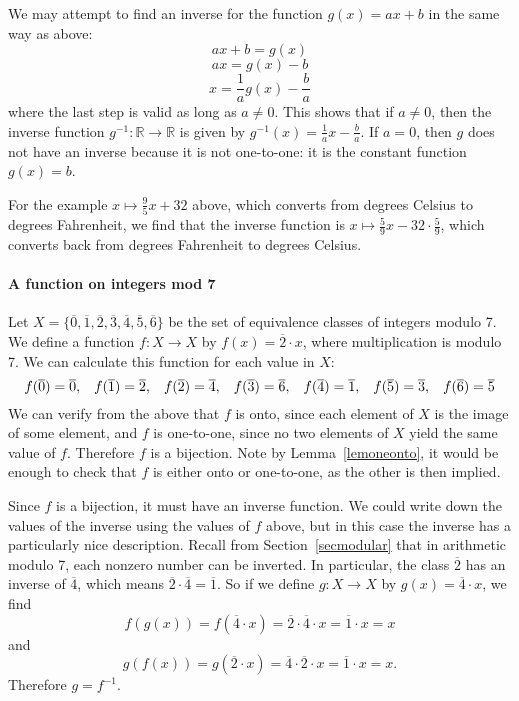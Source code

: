 We may attempt to find an inverse for the function $g(x) = ax+b$ in the same way as above:
\[
ax+b = g(x)
\]
\[
ax=g(x)-b
\]
\[
x = \frac{1}{a}g(x)-\frac{b}{a}
\]
where the last step is valid as long as $a \neq 0$.
This shows that if $a \neq 0$, then the inverse function $g^{-1} \colon \mathbb{R} \to \mathbb{R}$ is given by $g^{-1}(x) = \frac{1}{a}x-\frac{b}{a}$.
If $a=0$, then $g$ does not have an inverse because it is not one-to-one: it is the constant function $g(x)=b$.

For the example $x \mapsto \frac{9}{5} x + 32$ above, which converts from degrees Celsius to degrees Fahrenheit, we find that the inverse function is $x \mapsto \frac{5}{9} x - 32 \cdot \frac{5}{9}$, which converts back from degrees Fahrenheit to degrees Celsius.

\paragraph{A function on integers mod 7}

Let $X = \{ \overline{0}, \overline{1}, \overline{2}, \overline{3}, \overline{4}, \overline{5}, \overline{6}\}$ be the set of equivalence classes of integers modulo 7.
We define a function $f \colon X \to X$ by $f(x) = \overline{2} \cdot x$, where multiplication is modulo 7.
We can calculate this function for each value in $X$:
\[
f(\overline{0}) = \overline{0}, \hspace{.3cm}
f(\overline{1}) = \overline{2}, \hspace{.3cm}
f(\overline{2}) = \overline{4}, \hspace{.3cm}
f(\overline{3}) = \overline{6}, \hspace{.3cm}
f(\overline{4}) = \overline{1}, \hspace{.3cm}
f(\overline{5}) = \overline{3}, \hspace{.3cm}
f(\overline{6}) = \overline{5}
\]
We can verify from the above that $f$ is onto, since each element of $X$ is the image of some element, and $f$ is one-to-one, since no two elements of $X$ yield the same value of $f$.
Therefore $f$ is a bijection.
Note by Lemma~\ref{lemoneonto},
it would be enough to check that $f$ is either onto or one-to-one, as the other is then implied.

Since $f$ is a bijection, it must have an inverse function.
We could write down the values of the inverse using the values of $f$ above, but in this case the inverse has a particularly nice description.
Recall from Section~\ref{secmodular}
that in arithmetic modulo 7, each nonzero number can be inverted.
In particular, the class $\overline{2}$ has an inverse of $\overline{4}$, which means $\overline{2} \cdot \overline{4} = \overline{1}$.
So if we define $g \colon X \to X$ by $g(x) = \overline{4} \cdot x$, we find
\[
f(g(x)) = f(\overline{4} \cdot x) = \overline{2} \cdot \overline{4} \cdot x = \overline{1} \cdot x = x
\]
and
\[
g(f(x)) = g(\overline{2} \cdot x) = \overline{4} \cdot \overline{2} \cdot x = \overline{1} \cdot x = x.
\]
Therefore $g = f^{-1}$.

